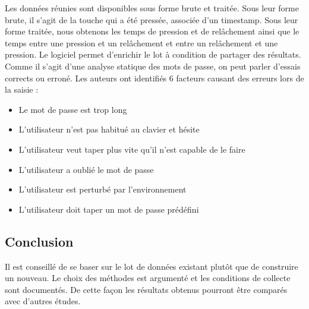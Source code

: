 Les données réunies sont disponibles sous forme brute et traitée. Sous leur forme brute, il s'agit de la touche qui a été pressée, associée d'un timestamp. Sous leur forme traitée, nous obtenons les temps de pression et de relâchement ainsi que le temps entre une pression et un relâchement et entre un relâchement et une pression. Le logiciel permet d'enrichir le lot à condition de partager des résultats.\\

Comme il s'agit d'une analyse statique des mots de passe, on peut parler d'essais corrects ou erroné. Les auteurs ont identifiés 6 facteurs causant des erreurs lors de la saisie :\\

\begin{itemize}
  \item Le mot de passe est trop long
  \item L'utilisateur n'est pas habitué au clavier et hésite
  \item L'utilisateur veut taper plus vite qu'il n'est capable de le faire
  \item L'utilisateur a oublié le mot de passe
  \item L'utilisateur est perturbé par l'environnement
  \item L'utilisateur doit taper un mot de passe prédéfini
\end{itemize}

\subsection{Conclusion}

Il est conseillé de se baser sur le lot de données existant plutôt que de construire un nouveau. Le choix des méthodes est argumenté et les conditions de collecte sont documentés. De cette façon les résultats obtenus pourront être comparés avec d'autres études.

